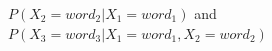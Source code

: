 \begin{frame}[shrink=5]
\begin{columns}
\begin{overlayarea}{\textwidth}{\textheight}
\begin{itemize}
							$P(X_2=word_2| X_1=word_1)$ and\\
							$P(X_3=word_3 | X_1=word_1, X_2=word_2)$
			\end{itemize}
		\end{overlayarea}
	\end{columns}
\end{frame}

